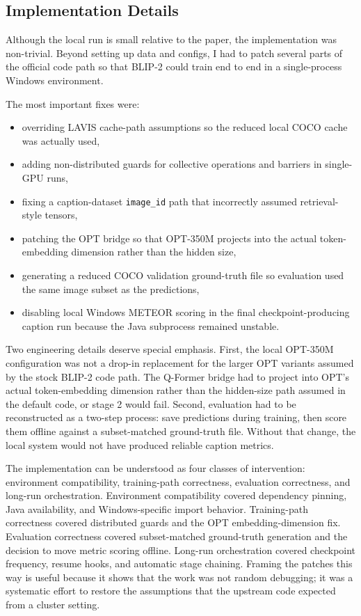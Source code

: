 \documentclass[11pt]{article}
\begin{document}
\subsection{Implementation Details}
Although the local run is small relative to the paper, the implementation was non-trivial. Beyond setting up data and configs, I had to patch several parts of the official code path so that BLIP-2 could train end to end in a single-process Windows environment.

The most important fixes were:
\begin{itemize}
\item overriding LAVIS cache-path assumptions so the reduced local COCO cache was actually used,
\item adding non-distributed guards for collective operations and barriers in single-GPU runs,
\item fixing a caption-dataset \texttt{image\_id} path that incorrectly assumed retrieval-style tensors,
\item patching the OPT bridge so that OPT-350M projects into the actual token-embedding dimension rather than the hidden size,
\item generating a reduced COCO validation ground-truth file so evaluation used the same image subset as the predictions,
\item disabling local Windows METEOR scoring in the final checkpoint-producing caption run because the Java subprocess remained unstable.
\end{itemize}

Two engineering details deserve special emphasis. First, the local OPT-350M configuration was not a drop-in replacement for the larger OPT variants assumed by the stock BLIP-2 code path. The Q-Former bridge had to project into OPT's actual token-embedding dimension rather than the hidden-size path assumed in the default code, or stage 2 would fail. Second, evaluation had to be reconstructed as a two-step process: save predictions during training, then score them offline against a subset-matched ground-truth file. Without that change, the local system would not have produced reliable caption metrics.

The implementation can be understood as four classes of intervention: environment compatibility, training-path correctness, evaluation correctness, and long-run orchestration. Environment compatibility covered dependency pinning, Java availability, and Windows-specific import behavior. Training-path correctness covered distributed guards and the OPT embedding-dimension fix. Evaluation correctness covered subset-matched ground-truth generation and the decision to move metric scoring offline. Long-run orchestration covered checkpoint frequency, resume hooks, and automatic stage chaining. Framing the patches this way is useful because it shows that the work was not random debugging; it was a systematic effort to restore the assumptions that the upstream code expected from a cluster setting.
\end{document}
